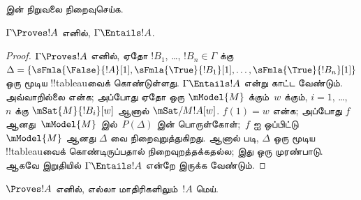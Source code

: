 \documentclass[../../../include/open-logic-section]{subfiles}
\begin{document}
\begin{prob}
 இன் நிறுவலை நிறைவுசெய்க.
\end{prob}

\begin{cor}
$\Gamma \Proves !A$ எனில், $\Gamma \Entails !A$.
\end{cor}

\begin{proof}
  $\Gamma \Proves !A$ எனில், ஏதோ $!B_1$, \dots, $!B_n \in \Gamma$
  க்கு $\Delta = \{\sFmla{\False}{!A}[1],
  \sFmla{\True}{!B_1}[1], \dots, \sFmla{\True}{!B_n}[1]\}$ ஒரு மூடிய
  !!{tableau}வைக் கொண்டுள்ளது. $\Gamma \Entails !A$ என்று காட்ட வேண்டும்.
  அவ்வாறில்லை என்க; அப்போது ஏதோ ஒரு $\mModel{M}$ க்கும்~$w$ க்கும்,
  $i=1$, \dots,~$n$ க்கு $\mSat{M}{!B_i}[w]$ ஆனால்
  $\mSat/{M}{!A}[w]$. $f(1) = w$ என்க; அப்போது $f$ ஆனது~$\mModel{M}$
  இல்~$P(\Delta)$ இன் பொருள்கோள்;~$f$ ஐ ஒப்பிட்டு~$\mModel{M}$ ஆனது
  $\Delta$ வை நிறைவுறுத்துகிறது. ஆனால்  படி,
  $\Delta$ ஒரு மூடிய !!{tableau}வைக் கொண்டிருப்பதால் நிறைவுறத்தக்கதல்ல;
  இது ஒரு முரண்பாடு. ஆகவே இறுதியில்
  $\Gamma \Entails !A$ என்றே இருக்க வேண்டும்.
\end{proof}

\begin{cor}
$\Proves !A$ எனில், எல்லா மாதிரிகளிலும்~$!A$ மெய்.
\end{cor}
\end{document}
